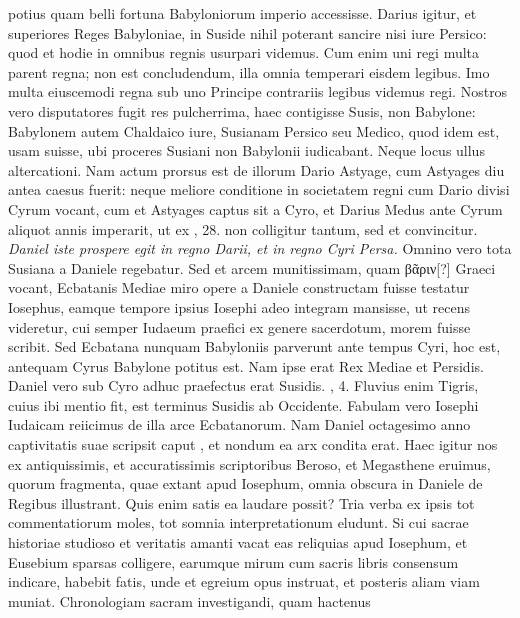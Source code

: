 potius quam belli fortuna Babyloniorum imperio accessisse.
Darius igitur, et superiores Reges Babyloniae, in Suside nihil poterant
sancire nisi iure Persico: quod et hodie in omnibus regnis usurpari
videmus.
Cum enim uni regi multa parent regna; non est concludendum,
illa omnia temperari eisdem legibus.
Imo multa eiuscemodi regna sub uno Principe contrariis
 legibus videmus regi.
%
Nostros vero disputatores fugit res pulcherrima,
 haec contigisse
Susis, non Babylone: Babylonem autem Chaldaico iure, Susianam
Persico seu Medico, quod idem est, usam suisse, ubi proceres Susiani
non Babylonii iudicabant.
Neque locus ullus altercationi.
Nam actum prorsus est de illorum Dario Astyage, cum Astyages diu antea
caesus fuerit: neque meliore conditione in societatem regni cum
Dario divisi Cyrum vocant, cum et Astyages captus sit a Cyro, et
Darius Medus ante Cyrum aliquot annis imperarit, ut ex , 28.
non colligitur tantum, sed et convincitur.
\textit{Daniel iste prospere egit in regno Darii,
 et in regno Cyri Persa.}
Omnino vero tota Susiana a Daniele regebatur.
Sed et arcem munitissimam, quam \textgreek{βᾶριν[?]}
Graeci vocant, Ecbatanis Mediae miro opere a Daniele constructam
fuisse testatur Iosephus, eamque tempore ipsius Iosephi adeo
integram mansisse, ut recens videretur, cui semper Iudaeum praefici
ex genere sacerdotum, morem fuisse scribit.
Sed Ecbatana nunquam
Babyloniis parverunt ante tempus Cyri, hoc est, antequam
Cyrus Babylone potitus est.
Nam ipse erat Rex Mediae et Persidis.
Daniel vero sub Cyro adhuc praefectus erat Susidis. , 4.
Fluvius
enim Tigris, cuius ibi mentio fit, est terminus Susidis ab Occidente.
Fabulam vero Iosephi Iudaicam reiicimus de illa arce Ecbatanorum.
Nam Daniel octagesimo anno captivitatis suae scripsit caput
, et nondum ea arx condita erat.
Haec igitur nos ex antiquissimis,
et accuratissimis scriptoribus Beroso, et Megasthene eruimus, quorum
fragmenta, quae extant apud Iosephum, omnia obscura in Daniele
de Regibus illustrant.
Quis enim satis ea laudare possit?
Tria verba ex ipsis tot commentatiorum moles,
 tot somnia interpretationum
eludunt.
Si cui sacrae historiae studioso et veritatis amanti
vacat eas reliquias apud Iosephum, et Eusebium sparsas colligere,
earumque mirum cum sacris libris consensum indicare, habebit
fatis, unde et egreium opus instruat, et posteris aliam viam
muniat.
Chronologiam sacram investigandi, quam hactenus
